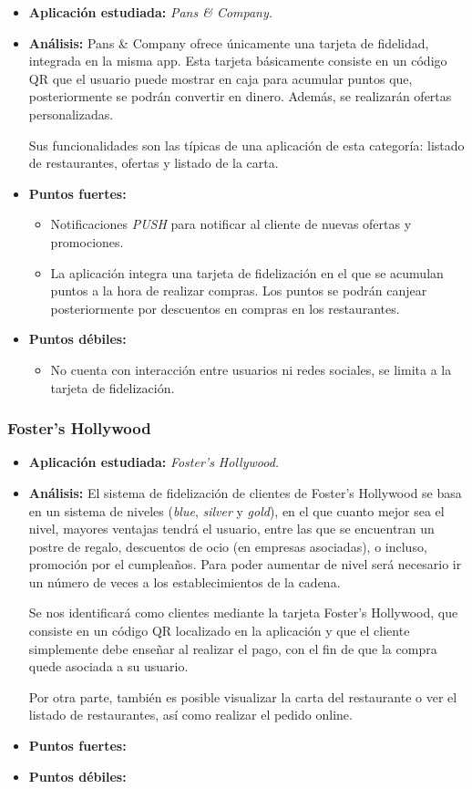 \documentclass[twoside]{report}
\begin{document}
\begin{itemize}
\item \textbf{Aplicación estudiada:} \cite{pansapp} \textit{Pans \& Company.}
\item \textbf{Análisis:} 
Pans \& Company ofrece únicamente una tarjeta de fidelidad, integrada en la misma app. Esta tarjeta básicamente consiste en un código QR que el usuario puede mostrar en caja para acumular puntos que, posteriormente se podrán convertir en dinero. Además, se realizarán ofertas personalizadas.

Sus funcionalidades son las típicas de una aplicación de esta categoría: listado de restaurantes, ofertas y listado de la carta.
\item \textbf{Puntos fuertes:}
	\begin{itemize}
	\item Notificaciones \textit{PUSH} para notificar al cliente de nuevas ofertas y promociones.
	\item La aplicación integra una tarjeta de fidelización en el que se acumulan puntos a la hora de realizar compras. Los puntos se podrán canjear posteriormente por descuentos en compras en los restaurantes.
	\end{itemize}
\item \textbf{Puntos débiles:}
	\begin{itemize}
	\item No cuenta con interacción entre usuarios ni redes sociales, se limita a la tarjeta de fidelización.
	\end{itemize}
\end{itemize}

\subsubsection{Foster's Hollywood}

\begin{itemize}
\item \textbf{Aplicación estudiada:} \cite{fostersh} \textit{Foster's Hollywood.}
\item \textbf{Análisis:} 
El sistema de fidelización de clientes de Foster's Hollywood se basa en un sistema de niveles (\textit{blue}, \textit{silver} y \textit{gold}), en el que cuanto mejor sea el nivel, mayores ventajas tendrá el usuario, entre las que se encuentran un postre de regalo, descuentos de ocio (en empresas asociadas), o incluso, promoción por el cumpleaños. Para poder aumentar de nivel será necesario ir un número de veces a los establecimientos de la cadena. 

Se nos identificará como clientes mediante la tarjeta Foster's Hollywood, que consiste en un código QR localizado en la aplicación y que el cliente simplemente debe enseñar al realizar el pago, con el fin de que la compra quede asociada a su usuario.

Por otra parte, también es posible visualizar la carta del restaurante o ver el listado de restaurantes, así como realizar el pedido online.
\item \textbf{Puntos fuertes:}
\item \textbf{Puntos débiles:}
\end{itemize}
\end{document}

